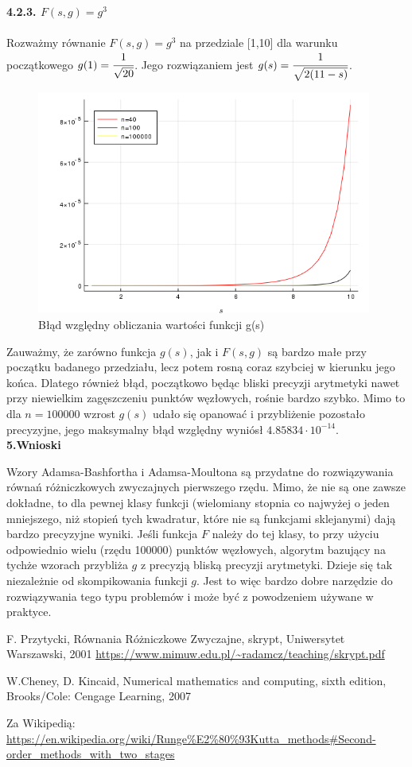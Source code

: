 \documentclass[a4paper]{article}
\begin{document}
\large
\textbf{4.2.3. $F(s,g) = g^3$}\\\\
\normalsize
Rozważmy równanie $F(s,g) = g^3$ na przedziale [1,10] dla warunku początkowego $g(1) = \cfrac{1}{ \sqrt{20}}$. Jego rozwiązaniem jest $g(s) = \cfrac{1}{ \sqrt{2(11-s)}}$.

\begin{figure}[h!]
  \includegraphics[width=11cm]{F3_error.png}
  \caption{Błąd względny obliczania wartości funkcji g(s)}
\end{figure}

Zauważmy, że zarówno funkcja $g(s)$, jak i $F(s,g)$ są bardzo małe przy początku badanego przedziału, lecz potem rosną coraz szybciej w kierunku jego końca. Dlatego również błąd, początkowo będąc bliski precyzji arytmetyki nawet przy niewielkim zagęszczeniu punktów węzłowych, rośnie bardzo szybko. Mimo to dla $n=100000$ wzrost $g(s)$ udało się opanować i przybliżenie pozostało precyzyjne, jego maksymalny błąd względny wyniósł $4.85834 \cdot 10^{-14}$.\\

\Large
\textbf{5.Wnioski}
\normalsize

Wzory Adamsa-Bashfortha i Adamsa-Moultona są przydatne do rozwiązywania równań różniczkowych zwyczajnych pierwszego rzędu. Mimo, że nie są one zawsze dokładne, to dla pewnej klasy funkcji (wielomiany stopnia co najwyżej o jeden mniejszego, niż stopień tych kwadratur, które nie są funkcjami sklejanymi) dają bardzo precyzyjne wyniki. Jeśli funkcja $F$ należy do tej klasy, to przy użyciu odpowiednio wielu (rzędu 100000) punktów węzłowych, algorytm bazujący na tychże wzorach przybliża $g$ z precyzją bliską precyzji arytmetyki. Dzieje się tak niezależnie od skompikowania funkcji $g$. Jest to więc bardzo dobre narzędzie do rozwiązywania tego typu problemów i może być z powodzeniem używane w praktyce.

\newpage
\begin{thebibliography}{9}
\itemsep2pt

 F. Przytycki, Równania Różniczkowe Zwyczajne, skrypt, Uniwersytet Warszawski, 2001 \url{https://www.mimuw.edu.pl/~radamcz/teaching/skrypt.pdf}

 W.Cheney, D. Kincaid, Numerical mathematics and computing, sixth edition, Brooks/Cole: Cengage Learning, 2007

 Za Wikipedią: \url{https://en.wikipedia.org/wiki/Runge%E2%80%93Kutta_methods#Second-order_methods_with_two_stages}

\end{thebibliography}
\end{document}
